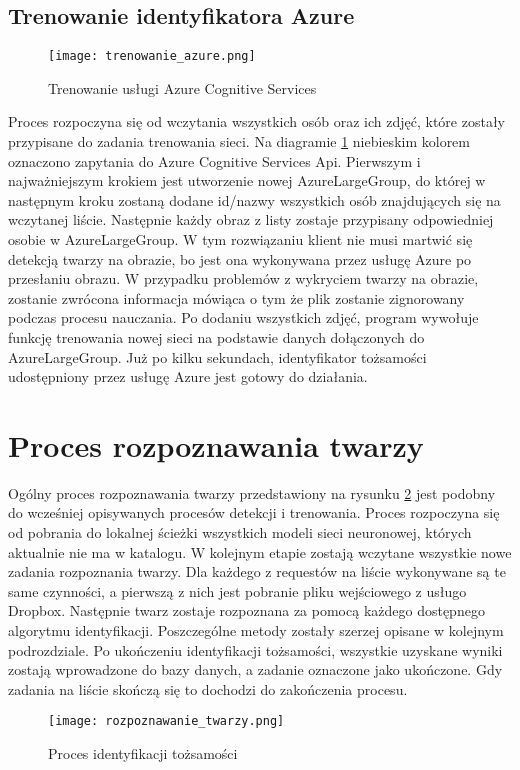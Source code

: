 \subsection{Trenowanie identyfikatora Azure} \label{trenowanie_azure}
\begin{figure}[H]
	\centering
	\texttt{[image: trenowanie\_azure.png]}
	\caption{Trenowanie usługi Azure Cognitive Services}
	\label{fig:trenowanie_azure}
\end{figure}
Proces rozpoczyna się od wczytania wszystkich osób oraz ich zdjęć, które zostały przypisane do zadania trenowania sieci. Na diagramie \ref{fig:trenowanie_azure} niebieskim kolorem oznaczono zapytania do Azure Cognitive Services Api. Pierwszym i najważniejszym krokiem jest utworzenie nowej AzureLargeGroup, do której w następnym kroku zostaną dodane id/nazwy wszystkich osób znajdujących się na wczytanej liście.  Następnie każdy obraz z listy zostaje przypisany odpowiedniej osobie w AzureLargeGroup. W tym rozwiązaniu klient nie musi martwić się detekcją twarzy na obrazie, bo jest ona wykonywana przez usługę Azure po przesłaniu obrazu. W przypadku problemów z wykryciem twarzy na obrazie, zostanie zwrócona informacja mówiąca o tym że plik zostanie zignorowany podczas procesu nauczania. Po dodaniu wszystkich zdjęć, program wywołuje funkcję trenowania nowej sieci na podstawie danych dołączonych do AzureLargeGroup. Już po kilku sekundach, identyfikator tożsamości udostępniony przez usługę Azure jest gotowy do działania.

\section{Proces rozpoznawania twarzy}
Ogólny proces rozpoznawania twarzy przedstawiony na rysunku \ref{fig:rozpoznawanie_proces} jest podobny do wcześniej opisywanych procesów detekcji i trenowania. Proces rozpoczyna się od pobrania do lokalnej ścieżki wszystkich modeli sieci neuronowej, których aktualnie nie ma w katalogu. W kolejnym etapie zostają wczytane wszystkie nowe zadania rozpoznania twarzy. Dla każdego z requestów na liście wykonywane są te same czynności, a pierwszą z nich jest pobranie pliku wejściowego z usługo Dropbox. Następnie twarz zostaje rozpoznana za pomocą każdego dostępnego algorytmu identyfikacji. Poszczególne metody zostały szerzej opisane w kolejnym podrozdziale. Po ukończeniu identyfikacji tożsamości, wszystkie uzyskane wyniki zostają wprowadzone do bazy danych, a zadanie oznaczone jako ukończone. Gdy zadania na liście skończą się to dochodzi do zakończenia procesu.
\begin{figure}[H]
	\centering
	\texttt{[image: rozpoznawanie\_twarzy.png]}
	\caption{Proces identyfikacji tożsamości}
	\label{fig:rozpoznawanie_proces}
\end{figure}

